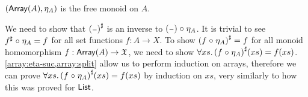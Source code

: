 \begin{propositionrep}\label{array:univ}
    $(\operatorname{\mathsf{Array}}(A),\eta_A)$ is the free monoid on $A$.
\end{propositionrep}

\begin{proofsketch}
    We need to show that ${({\scriptstyle{-}})}^{\sharp}$ is an inverse to ${({\scriptstyle{-}}) \mathrel{\circ} \eta_A}$.
    It is trivial to see ${f}^{\sharp} \mathrel{\circ} \eta_A = f$ for all set functions $f : A \to X$.
    To show ${(f \mathrel{\circ} \eta_A)}^{\sharp} = f$ for all monoid homomorphism $f : \operatorname{\mathsf{Array}}(A) \to \mathfrak{X}$,
    we need to show $\forall xs.\, {(f \mathrel{\circ} \eta_A)}^{\sharp}(xs) = f(xs)$.
    \cref{array:eta-suc,array:split} allow us to perform induction on arrays,
    therefore we can prove $\forall xs.\, {(f \mathrel{\circ} \eta_A)}^{\sharp}(xs) = f(xs)$ by induction on $xs$,
    very similarly to how this was proved for $\operatorname{\mathsf{List}}$.
\end{proofsketch}

